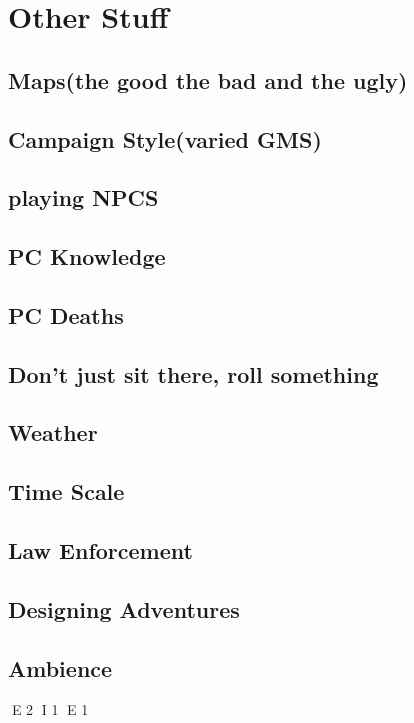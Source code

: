 \section{Other Stuff}
	\subsection{Maps(the good the bad and the ugly)}
	\subsection{Campaign Style(varied GMS)}
	\subsection{playing NPCS}
	\subsection{PC Knowledge}
	\subsection{PC Deaths}
	\subsection{Don't just sit there, roll something}
	\subsection{Weather}
	\subsection{Time Scale}
	\subsection{Law Enforcement}
	\subsection{Designing Adventures}
	\subsection{Ambience}


E 2
I 1
E 1
